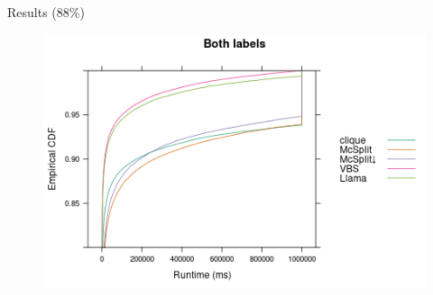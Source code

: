 \documentclass{beamer}
\begin{document}
\begin{frame}{Results (88\%)}
  \begin{figure}
    \centering
    \includegraphics[width=\textwidth]{../dissertation/images/ecdf_both_labels_llama.png}
  \end{figure}
\end{frame}
\end{document}
